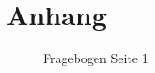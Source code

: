 
\appendix
\chapter{Anhang}


\begin{figure}
    \centering
    \caption{Fragebogen Seite 1}
    \label{frabo1}
\end{figure}

